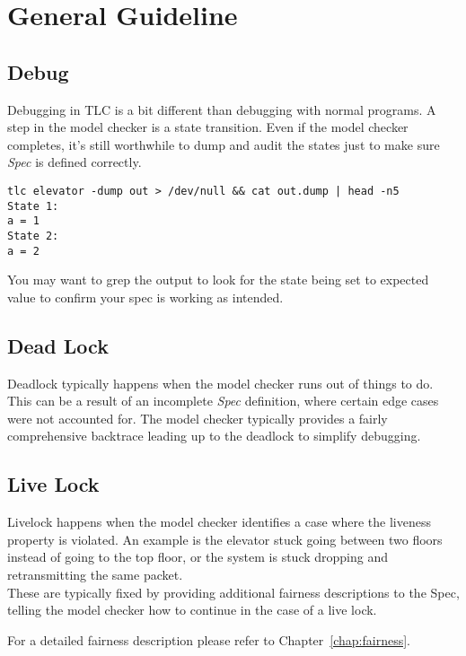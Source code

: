 \chapter{General Guideline}

\section{Debug}

Debugging in TLC is a bit different than debugging with normal programs. A step
in the model checker is a state transition. Even if the model checker completes,
it's still worthwhile to dump and audit the states just to make sure
\textit{Spec} is defined correctly.

\begin{verbatim}
tlc elevator -dump out > /dev/null && cat out.dump | head -n5
State 1:
a = 1
State 2:
a = 2
\end{verbatim}

You may want to grep the output to look for the state being set to expected
value to confirm your spec is working as intended.

\section{Dead Lock}

Deadlock typically happens when the model checker runs out of things to do. This
can be a result of an incomplete \textit{Spec} definition, where certain edge
cases were not accounted for. The model checker typically provides a fairly
comprehensive backtrace leading up to the deadlock to simplify debugging.

\section{Live Lock}

Livelock happens when the model checker identifies a case where the liveness
property is violated. An example is the elevator stuck going between two floors 
instead of going to the top floor, or the system is stuck dropping and
retransmitting the same packet.\\

These are typically fixed by providing additional fairness descriptions to the
Spec, telling the model checker how to continue in the case of a live lock.\newline 

For a detailed fairness description please refer to Chapter~\ref{chap:fairness}.

